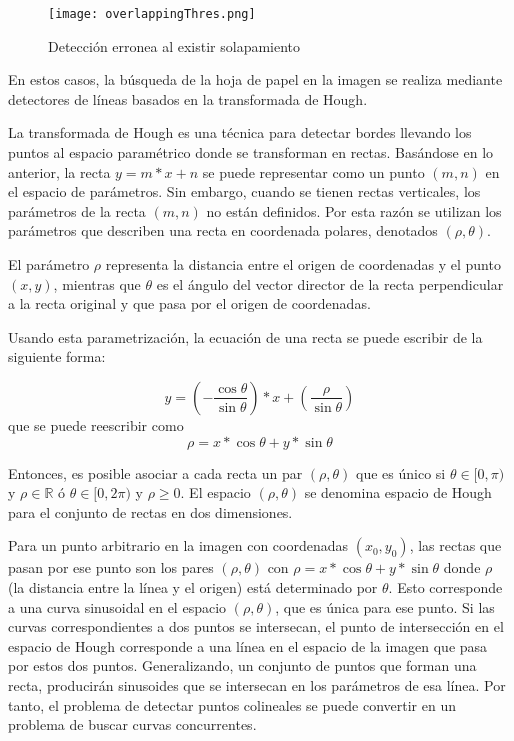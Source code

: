 \begin{figure}[h!] 
  \centering
  \texttt{[image: overlappingThres.png]}
  \caption{Detección erronea al existir solapamiento}
  \label{fig:overlappingThres}
\end{figure}

En estos casos, la búsqueda de la hoja de papel en la imagen se realiza mediante detectores de líneas basados
en la transformada de Hough.

La transformada de Hough es una técnica para detectar bordes llevando los puntos al espacio
paramétrico donde se transforman en rectas.
Basándose en lo anterior, la recta $y = m*x+n$ se puede representar como un punto $(m,n)$ en el
espacio de parámetros. Sin embargo, cuando se tienen rectas
verticales, los parámetros de la recta $(m,n)$  no están definidos. Por esta razón se utilizan los parámetros
que describen una recta en coordenada polares, denotados $(\rho,\theta)$.

El parámetro $\rho$ representa la distancia entre el origen de coordenadas y el punto$(x,y)$,
mientras que $\theta$ es el ángulo del vector director de la recta perpendicular a la recta original
y que pasa por el origen de coordenadas.

Usando esta parametrización, la ecuación de una recta se puede escribir de la siguiente forma:

\begin{equation}
y=(-\dfrac{\cos \theta}{\sin \theta}) * x + (\dfrac{\rho}{\sin \theta})
\end{equation}
que se puede reescribir como
\begin{equation}
\rho=x * \cos \theta + y * \sin \theta
\end{equation}

Entonces, es posible asociar a cada recta un par $(\rho,\theta)$ que es único si $\theta \in
[0,\pi)$ y $\rho \in \mathbb{R}$ ó $\theta \in [0,2\pi)$ y $\rho \geq 0$. El espacio
$(\rho,\theta)$ se denomina espacio de Hough para el conjunto de rectas en dos dimensiones.

Para un punto arbitrario en la imagen con coordenadas $(x_0,y_0)$, las rectas que pasan por ese punto
son los pares  $(\rho,\theta)$ con  $\rho=x*\cos \theta + y * \sin \theta$ donde $\rho$ (la
distancia entre la línea y el origen) está determinado por $\theta$. Esto corresponde a una curva
sinusoidal en el espacio  $(\rho,\theta)$, que es única para ese punto. Si las curvas
correspondientes  a dos puntos se intersecan, el punto de intersección en el espacio de Hough
corresponde  a una línea en el espacio de la imagen que pasa por estos dos puntos. Generalizando, un
conjunto de puntos que forman una recta, producirán sinusoides que se intersecan en los parámetros
de esa línea. Por tanto, el problema de detectar puntos colineales se puede convertir en un problema
de buscar curvas concurrentes.

